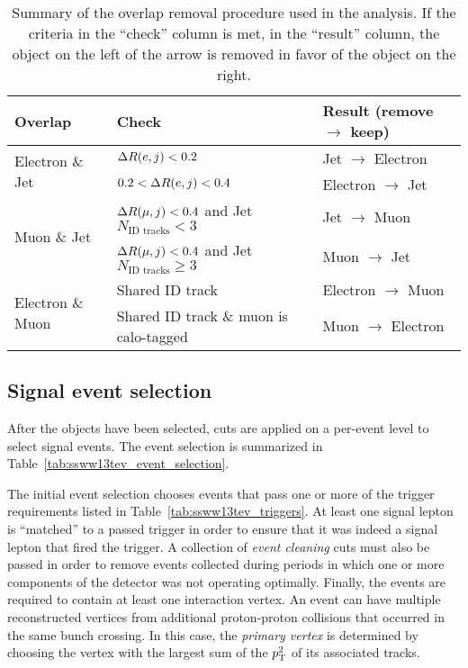 \begin{table}[htbp]
  \centering
  \begin{tabular}{l l l}
    Overlap         & Check & Result (remove $\rightarrow$ keep) \\
    \hline\hline
    \multirow{2}{*}{Electron \& Jet}  & $\Delta R(e,j) < 0.2$       & Jet $\rightarrow$ Electron \\
                                      & $0.2 < \Delta R(e,j) < 0.4$ & Electron $\rightarrow$ Jet \\
    \hline
    \multirow{2}{*}{Muon \& Jet}      & $\Delta R(\mu,j) < 0.4$ and Jet $N_{\textrm{ID\ tracks}} < 3$
                                                                   & Jet $\rightarrow$ Muon \\
                                      & $\Delta R(\mu,j) < 0.4$ and Jet $N_{\textrm{ID\ tracks}} \ge 3$
                                                                   & Muon $\rightarrow$ Jet \\
    \hline
    \multirow{2}{*}{Electron \& Muon} & Shared ID track            & Electron $\rightarrow$ Muon \\
                                      & Shared ID track \& muon is calo-tagged
                                                                   & Muon $\rightarrow$ Electron \\
    \hline
  \end{tabular}
  \caption{Summary of the overlap removal procedure used in the analysis.  If the criteria in the ``check'' column is met, in the ``result'' column, the object on the left of the arrow is removed in favor of the object on the right.}
  \label{tab:ssww13tev_or}
\end{table}

\subsection{Signal event selection}\label{ssww13tev:event_selection}
After the objects have been selected, cuts are applied on a per-event level to select \ssww signal events.
The event selection is summarized in Table~\ref{tab:ssww13tev_event_selection}. %

The initial event selection chooses events that pass one or more of the trigger requirements listed in Table~\ref{tab:ssww13tev_triggers}.
At least one signal lepton is ``matched'' to a passed trigger in order to ensure that it was indeed a signal lepton that fired the trigger.
A collection of \emph{event cleaning} cuts must also be passed in order to remove events collected during periods in which one or more components of the detector was not operating optimally.
Finally, the events are required to contain at least one interaction vertex.
An event can have multiple reconstructed vertices from additional proton-proton collisions that occurred in the same bunch crossing.
In this case, the \emph{primary vertex} is determined by choosing the vertex with the largest sum of the $p_{\mathrm{T}}^2$ of its associated tracks.

